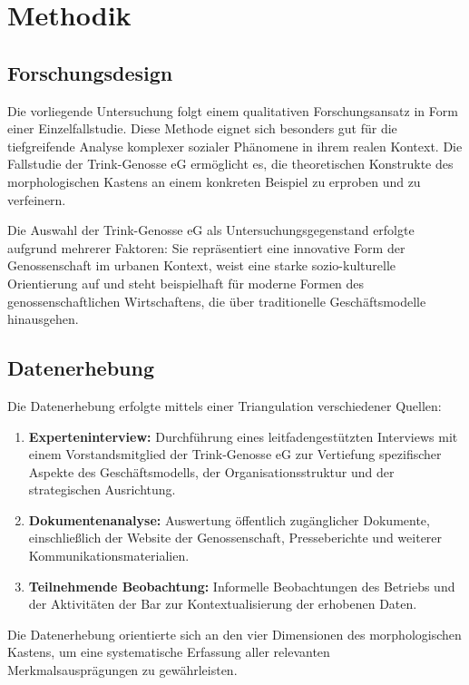\section{Methodik}

\subsection{Forschungsdesign}

Die vorliegende Untersuchung folgt einem qualitativen Forschungsansatz in Form einer Einzelfallstudie. Diese Methode eignet sich besonders gut für die tiefgreifende Analyse komplexer sozialer Phänomene in ihrem realen Kontext. Die Fallstudie der Trink-Genosse eG ermöglicht es, die theoretischen Konstrukte des morphologischen Kastens an einem konkreten Beispiel zu erproben und zu verfeinern.

Die Auswahl der Trink-Genosse eG als Untersuchungsgegenstand erfolgte aufgrund mehrerer Faktoren: Sie repräsentiert eine innovative Form der Genossenschaft im urbanen Kontext, weist eine starke sozio-kulturelle Orientierung auf und steht beispielhaft für moderne Formen des genossenschaftlichen Wirtschaftens, die über traditionelle Geschäftsmodelle hinausgehen.

\subsection{Datenerhebung}

Die Datenerhebung erfolgte mittels einer Triangulation verschiedener Quellen:

\begin{enumerate}
\item \textbf{Experteninterview:} Durchführung eines leitfadengestützten Interviews mit einem Vorstandsmitglied der Trink-Genosse eG zur Vertiefung spezifischer Aspekte des Geschäftsmodells, der Organisationsstruktur und der strategischen Ausrichtung.

\item \textbf{Dokumentenanalyse:} Auswertung öffentlich zugänglicher Dokumente, einschließlich der Website der Genossenschaft, Presseberichte und weiterer Kommunikationsmaterialien.

\item \textbf{Teilnehmende Beobachtung:} Informelle Beobachtungen des Betriebs und der Aktivitäten der Bar zur Kontextualisierung der erhobenen Daten.
\end{enumerate}

Die Datenerhebung orientierte sich an den vier Dimensionen des morphologischen Kastens, um eine systematische Erfassung aller relevanten Merkmalsausprägungen zu gewährleisten.

